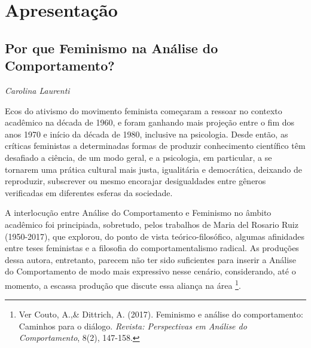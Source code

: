 \chapter*{Apresentação}
\section*{Por que Feminismo na Análise do Comportamento?}
\begin{flushright}
    \emph{Carolina Laurenti}
\end{flushright}

Ecos do ativismo do movimento feminista começaram a ressoar no contexto acadêmico na década de 1960, e foram ganhando mais projeção entre o fim dos anos 1970 e início da década de 1980, inclusive na psicologia. Desde então, as críticas feministas a determinadas formas de produzir conhecimento científico têm desafiado a ciência, de um modo geral, e a psicologia, em particular, a se tornarem uma prática cultural mais justa, igualitária e democrática, deixando de reproduzir, subscrever ou mesmo encorajar desigualdades entre gêneros verificadas em diferentes esferas da sociedade. 

A interlocução entre Análise do Comportamento e Feminismo no âmbito acadêmico foi principiada, sobretudo, pelos trabalhos de Maria del Rosario Ruiz (1950-2017), que explorou, do ponto de vista teórico-filosófico, algumas afinidades entre teses feministas e a filosofia do comportamentalismo radical. As produções dessa autora, entretanto, parecem não ter sido suficientes para inserir a Análise do Comportamento de modo mais expressivo nesse cenário, considerando, até o momento, a escassa produção que discute essa aliança na área \footnote{Ver Couto, A.,\& Dittrich, A. (2017). Feminismo e análise do comportamento: Caminhos para o diálogo. \emph{Revista: Perspectivas em Análise do Comportamento}, 8(2), 147-158.}.

